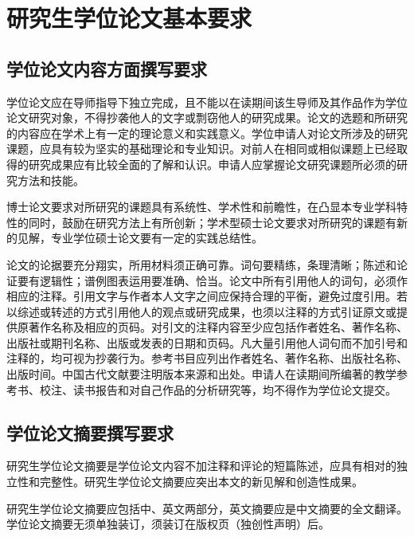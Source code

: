 
\chapter{研究生学位论文基本要求}

\section{学位论文内容方面撰写要求}

学位论文应在导师指导下独立完成，且不能以在读期间该生导师及其作品作为学位论文研究对象，不得抄袭他人的文字或剽窃他人的研究成果。论文的选题和所研究的内容应在学术上有一定的理论意义和实践意义。学位申请人对论文所涉及的研究课题，应具有较为坚实的基础理论和专业知识。对前人在相同或相似课题上已经取得的研究成果应有比较全面的了解和认识。申请人应掌握论文研究课题所必须的研究方法和技能。

博士论文要求对所研究的课题具有系统性、学术性和前瞻性，在凸显本专业学科特性的同时，鼓励在研究方法上有所创新；学术型硕士论文要求对所研究的课题有新的见解，专业学位硕士论文要有一定的实践总结性。

论文的论据要充分翔实，所用材料须正确可靠。词句要精练，条理清晰；陈述和论证要有逻辑性；谱例图表运用要准确、恰当。论文中所有引用他人的词句，必须作相应的注释。引用文字与作者本人文字之间应保持合理的平衡，避免过度引用。若以综述或转述的方式引用他人的观点或研究成果，也须以注释的方式引证原文或提供原著作名称及相应的页码。对引文的注释内容至少应包括作者姓名、著作名称、出版社或期刊名称、出版或发表的日期和页码。凡大量引用他人词句而不加引号和注释的，均可视为抄袭行为。参考书目应列出作者姓名、著作名称、出版社名称、出版时间。中国古代文献要注明版本来源和出处。申请人在读期间所编著的教学参考书、校注、读书报告和对自己作品的分析研究等，均不得作为学位论文提交。

\section{学位论文摘要撰写要求}

研究生学位论文摘要是学位论文内容不加注释和评论的短篇陈述，应具有相对的独立性和完整性。研究生学位论文摘要应突出本文的新见解和创造性成果。

研究生学位论文摘要应包括中、英文两部分，英文摘要应是中文摘要的全文翻译。学位论文摘要无须单独装订，须装订在版权页（独创性声明）后。